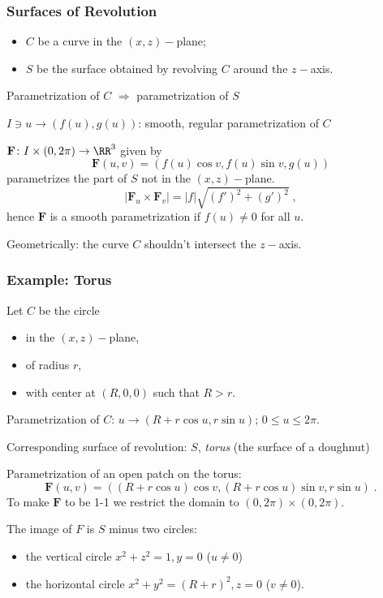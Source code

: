 \begin{frame}
  \frametitle{Surfaces of Revolution}

\begin{itemize}
  \item $C$ be a curve in the $(x,z)-$plane;
  \item $S$ be the surface obtained by revolving $C$ around the $z-$axis.
\end{itemize}

\begin{center}
  Parametrization of $C$ $\Longrightarrow$ parametrization of $S$
\end{center}

\pause
$I \ni u\to (f(u),g(u))$: smooth, regular parametrization of $C$

\pause
$\textbf{F} \colon I \times (0,2\pi) \to \RR^3$ given by
%
$$\textbf{F}(u,v) = (f(u)\cos{v}, f(u)\sin{v}, g(u))$$
%
parametrizes the part of $S$ not in the $(x,z)-$plane. \pause
%
$$|\textbf{F}_u \times \textbf{F}_v| = |f|\sqrt{(f')^2+(g')^2}\; ,$$
%
hence $\textbf{F}$ is a smooth parametrization if $f(u) \neq 0$ for all $u$.

\pause
Geometrically: the curve $C$ shouldn't intersect the $z-$axis.
\end{frame}

\begin{frame}
  \frametitle{Example: Torus}

  Let $C$ be the circle
  \begin{itemize}
    \item in the $(x,z)-$plane,
    \item of radius $r$,
    \item with center at $(R,0,0)$  such that $R > r$.
  \end{itemize}

  Parametrization of $C$: \pause $u \to (R+r\cos{u}, r\sin{u})$; $0 \leqslant u \leqslant 2\pi$.

  Corresponding surface of revolution: $S$\pause , \emph{torus} (the surface of a doughnut)

  Parametrization of an open patch on the torus:\pause
%
$$\textbf{F}(u,v) = ((R+r\cos{u})\cos{v}, (R+r\cos{u})\sin{v}, r\sin{u})\; .$$
%
\pause To make $\textbf{F}$ to be 1-1 we restrict the domain to $(0,2\pi) \times (0,2\pi)$.

The image of $F$ is \pause $S$ minus two circles:
\begin{itemize}
  \item the vertical circle $x^2+z^2=1, y=0$ ($u \neq 0$)
  \item the horizontal circle $x^2+y^2 = (R+r)^2, z=0$ ($v \neq 0$).
\end{itemize}

\end{frame}

